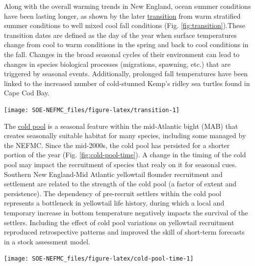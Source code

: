 \documentclass[
  10pt,
]{article}
\let\origfigure\figure
\let\endorigfigure\endfigure
\renewenvironment{figure}[1][2] {
    \expandafter\origfigure\expandafter[H]
} {
    \endorigfigure
}
\begin{document}
Along with the overall warming trends in New England, ocean summer conditions have been lasting longer, as shown by the later \href{https://noaa-edab.github.io/catalog/trans_dates.html}{transition} from warm stratified summer conditions to well mixed cool fall conditions (Fig. \ref{fig:transition}).These transition dates are defined as the day of the year when surface temperatures change from cool to warm conditions in the spring and back to cool conditions in the fall. Changes in the broad seasonal cycles of their environment can lead to changes in species biological processes (migrations, spawning, etc.) that are triggered by seasonal events. Additionally, prolonged fall temperatures have been linked to the increased number of cold-stunned Kemp's ridley sea turtles found in Cape Cod Bay.

\begin{figure}

{\centering \texttt{[image: SOE-NEFMC\_files/figure-latex/transition-1]} 

}

\caption{Ocean summer length: the annual total number of days between the spring thermal transition date and the fall thermal transition date.}\label{fig:transition}
\end{figure}

The \href{https://noaa-edab.github.io/catalog/cold_pool.html}{cold pool} is a seasonal feature within the mid-Atlantic bight (MAB) that creates seasonally suitable habitat for many species, including some managed by the NEFMC. Since the mid-2000s, the cold pool has persisted for a shorter portion of the year (Fig. \ref{fig:cold-pool-time}). A change in the timing of the cold pool may impact the recruitment of species that realy on it for seasonal cues. Southern New England-Mid Atlantic yellowtail flounder recruitment and settlement are related to the strength of the cold pool (a factor of extent and persistence). The dependency of pre-recruit settlers within the cold pool represents a bottleneck in yellowtail life history, during which a local and temporary increase in bottom temperature negatively impacts the survival of the settlers. Including the effect of cold pool variations on yellowtail recruitment reproduced retrospective patterns and improved the skill of short-term forecasts in a stock assessment model.

\begin{figure}

{\centering \texttt{[image: SOE-NEFMC\_files/figure-latex/cold-pool-time-1]} 

}

\caption{Cold pool persistence index based on bias-corrected ROMS-NWA (open circles) and GLORYS (closed circles).}\label{fig:cold-pool-time}
\end{figure}
\end{document}
